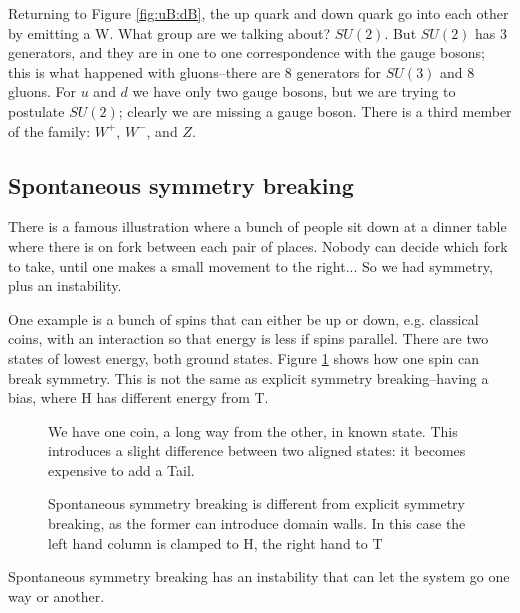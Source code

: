 \documentclass[]{article}
\begin{document}
Returning to Figure \ref{fig:uB:dB}, the up quark and down quark go into each other by emitting a W. What group are we talking about? $SU(2)$. But $SU(2)$ has 3 generators, and they are in one to one correspondence with the gauge bosons; this is what happened with gluons--there are 8 generators for $SU(3)$ and 8 gluons. For $u$ and $d$ we have only two gauge bosons, but we are trying to postulate $SU(2)$; clearly we are missing a gauge boson. There is a third member of the family: $W^+$, $W^-$, and $Z$.

\subsection{Spontaneous symmetry breaking}

There is a famous illustration where a bunch of people sit down at a dinner table where there is on fork between each pair of places. Nobody can decide which fork to take, until one makes a small movement to the right... So we had symmetry, plus an instability.
 
One example is a bunch of spins that can either be up or down, e.g. classical coins, with an interaction so that energy is less if spins parallel. There are two states of lowest energy, both ground states. Figure \ref{fig:2-6-sponteneous} shows how one spin can break symmetry. This is not the same as explicit symmetry breaking--having a bias, where H has different energy from T.
 

\begin{figure}[H]
	\begin{center}
 		\caption[Spontaneous symmetry breaking]{We have one coin, a long way from the other, in known state. This introduces a slight difference between two aligned states: it becomes expensive to add a Tail.}\label{fig:2-6-sponteneous}
 	\end{center}
\end{figure}

\begin{figure}[H]
	\caption[Domain Walls]{Spontaneous symmetry breaking is different from explicit symmetry breaking, as the former can introduce domain walls. In this case the left hand column is clamped to H, the right hand to T}
\end{figure}
Spontaneous symmetry breaking has an instability that can let the system go one way or another.
\end{document}
